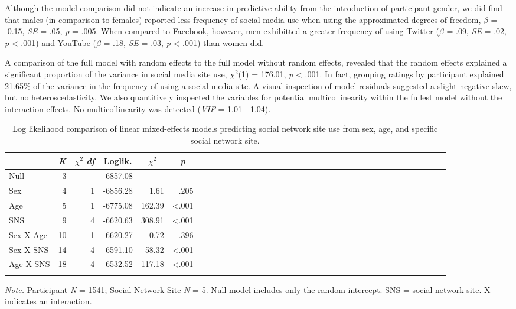 \documentclass[man, fleqn, noextraspace]{apa6}
\theoremstyle{definition}
\theoremstyle{definition}
\theoremstyle{definition}
\theoremstyle{remark}
\begin{document}
Although the model comparison did not indicate an increase in predictive
ability from the introduction of participant gender, we did find that
males (in comparison to females) reported less frequency of social media
use when using the approximated degrees of freedom, \(\beta\) = -0.15,
\emph{SE} = .05, \emph{p} = .005. When compared to Facebook, however,
men exhibitted a greater frequency of using Twitter (\(\beta\) = .09,
\emph{SE} = .02, \emph{p} \textless{} .001) and YouTube (\(\beta\) =
.18, \emph{SE} = .03, \emph{p} \textless{} .001) than women did.

A comparison of the full model with random effects to the full model
without random effects, revealed that the random effects explained a
significant proportion of the variance in social media site use,
\(\chi^2\)(1) = 176.01, \emph{p} \textless{} .001. In fact, grouping
ratings by participant explained 21.65\% of the variance in the
frequency of using a social media site. A visual inspection of model
residuals suggested a slight negative skew, but no heteroscedasticity.
We also quantitively inspected the variables for potential
multicollinearity within the fullest model without the interaction
effects. No multicollinearity was detected (\emph{VIF} = 1.01 - 1.04).

\begin{table}[tbp]
\begin{center}
\begin{threeparttable}
\caption{\label{tab:df_lmer_table}Log likelihood comparison of linear mixed-effects models predicting social network site use from sex, age, and specific social network site.}
\begin{tabular}{lrrrrrlrrrrrlrrrrrlrrrrrlrrrrrlrrrrr}
\toprule
 & \multicolumn{1}{c}{\textit{K}} & \multicolumn{1}{c}{$\chi^2$ \textit{df}} & \multicolumn{1}{c}{Loglik.} & \multicolumn{1}{c}{$\chi^2$} & \multicolumn{1}{c}{\textit{p}}\\
\midrule
Null & 3 &  & -6857.08 &  & \\
Sex & 4 & 1 & -6856.28 & 1.61 & .205\\
Age & 5 & 1 & -6775.08 & 162.39 & <.001\\
SNS & 9 & 4 & -6620.63 & 308.91 & <.001\\
Sex X Age & 10 & 1 & -6620.27 & 0.72 & .396\\
Sex X SNS & 14 & 4 & -6591.10 & 58.32 & <.001\\
Age X SNS & 18 & 4 & -6532.52 & 117.18 & <.001\\
\bottomrule
\addlinespace
\end{tabular}
\begin{tablenotes}[para]
\normalsize{\textit{Note.} Participant \textit{N} = 1541; Social Network Site \textit{N} = 5. Null model includes only the random intercept. SNS = social network site. X indicates an interaction.}
\end{tablenotes}
\end{threeparttable}
\end{center}
\end{table}
\end{document}
